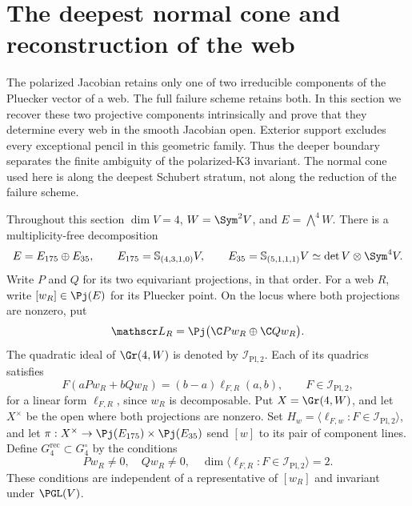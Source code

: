 \section{The deepest normal cone and reconstruction of the web}
\label{sec:intrinsic-web-reconstruction}

The polarized Jacobian retains only one of two irreducible components
of the Pluecker vector of a web.  The full failure scheme retains
both.  In this section we recover these two projective components
intrinsically and prove that they determine every web in the smooth
Jacobian open.  Exterior support excludes every exceptional pencil
in this geometric family.  Thus the deeper boundary separates the
finite ambiguity of the polarized-K3 invariant.  The normal cone
used here is along the deepest Schubert stratum, not along the
reduction of the failure scheme.

Throughout this section \(\dim V=4\), \(W=\Sym^2V\), and
\(E=\bigwedge^4W\).  There is a multiplicity-free decomposition
\begin{equation}\label{eq:two-web-components}
 E=E_{175}\oplus E_{35},\qquad
 E_{175}=\mathbb S_{(4,3,1,0)}V,\qquad
 E_{35}=\mathbb S_{(5,1,1,1)}V
       \simeq\det V\otimes\Sym^4V.
\end{equation}
Write \(P\) and \(Q\) for its two equivariant projections, in
that order.  For a web \(R\), write \([w_R]\in\Pj(E)\) for
its Pluecker point.  On the locus where both projections are nonzero,
put
\[
 \mathscr L_R=\Pj\bigl(\C Pw_R\oplus\C Qw_R\bigr).
\]
The quadratic ideal of \(\Gr(4,W)\) is denoted by
\(\mathcal I_{\mathrm{Pl},2}\).  Each of its quadrics satisfies
\begin{equation}\label{eq:plucker-linear-quotient}
 F(aPw_R+bQw_R)=(b-a)\ell_{F,R}(a,b),
 \qquad F\in\mathcal I_{\mathrm{Pl},2},
\end{equation}
for a linear form \(\ell_{F,R}\), since \(w_R\) is decomposable.
Put \(X=\Gr(4,W)\), and let \(X^\times\) be the open
where both projections are nonzero.  Set
\(H_w=\langle\ell_{F,w}:F\in\mathcal I_{\mathrm{Pl},2}\rangle\),
and let \(\pi:X^\times\to\Pj(E_{175})\times\Pj(E_{35})\)
send \([w]\) to its pair of component lines.
Define \(G_4^{\mathrm{rec}}\subset G_4^\circ\) by the conditions
\begin{equation}\label{eq:reconstruction-open}
 Pw_R\ne0,\quad Qw_R\ne0,\quad
 \dim\langle\ell_{F,R}:F\in\mathcal I_{\mathrm{Pl},2}\rangle=2.
\end{equation}
These conditions are independent of a representative of \([w_R]\)
and invariant under \(\PGL(V)\).

